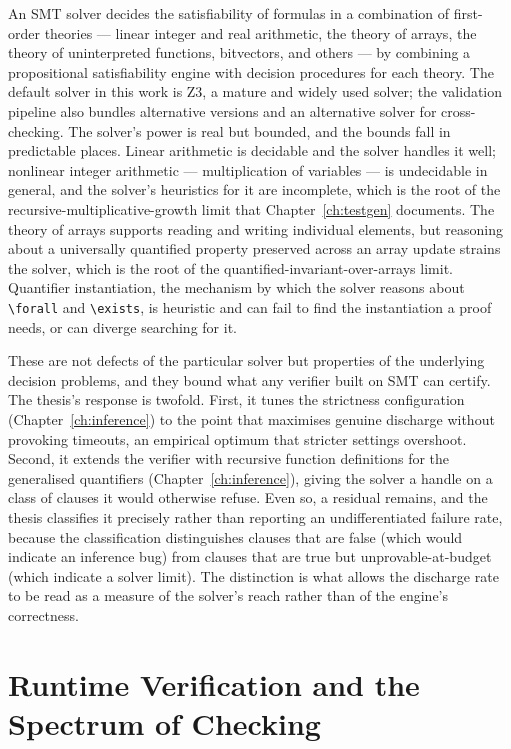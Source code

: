 An SMT solver decides the satisfiability of formulas in a combination of
first-order theories --- linear integer and real arithmetic, the theory of
arrays, the theory of uninterpreted functions, bitvectors, and others --- by
combining a propositional satisfiability engine with decision procedures for each
theory. The default solver in this work is Z3, a mature and widely used solver;
the validation pipeline also bundles alternative versions and an alternative
solver for cross-checking. The solver's power is real but bounded, and the bounds
fall in predictable places. Linear arithmetic is decidable and the solver handles
it well; nonlinear integer arithmetic --- multiplication of variables --- is
undecidable in general, and the solver's heuristics for it are incomplete, which
is the root of the recursive-multiplicative-growth limit that
Chapter~\ref{ch:testgen} documents. The theory of arrays supports reading and
writing individual elements, but reasoning about a universally quantified
property preserved across an array update strains the solver, which is the root of
the quantified-invariant-over-arrays limit. Quantifier instantiation, the
mechanism by which the solver reasons about \texttt{\textbackslash forall} and
\texttt{\textbackslash exists}, is heuristic and can fail to find the
instantiation a proof needs, or can diverge searching for it.

These are not defects of the particular solver but properties of the underlying
decision problems, and they bound what any verifier built on SMT can certify. The
thesis's response is twofold. First, it tunes the strictness configuration
(Chapter~\ref{ch:inference}) to the point that maximises genuine discharge without
provoking timeouts, an empirical optimum that stricter settings overshoot.
Second, it extends the verifier with recursive function definitions for the
generalised quantifiers (Chapter~\ref{ch:inference}), giving the solver a handle
on a class of clauses it would otherwise refuse. Even so, a residual remains, and
the thesis classifies it precisely rather than reporting an undifferentiated
failure rate, because the classification distinguishes clauses that are false
(which would indicate an inference bug) from clauses that are true but
unprovable-at-budget (which indicate a solver limit). The distinction is what
allows the discharge rate to be read as a measure of the solver's reach rather
than of the engine's correctness.

\section{Runtime Verification and the Spectrum of Checking}
\label{sec:bg-rv}

